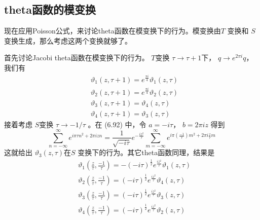 \subsection{theta函数的模变换}
现在应用Poisson公式，来讨论theta函数在模变换下的行为。模变换由$ T$ 变换和 $S $变换生成，那么考虑这两个变换就够了。

首先讨论Jacobi theta函数在模变换下的行为。 $T $变换 $\tau \rightarrow \tau+1 $下， $q \rightarrow e^{2 \pi i} q $，我们有
\begin{align} &\vartheta_{1}(z, \tau+1)=e^{\frac{\pi i}{4}} \vartheta_{1}(z, \tau)\\ &\vartheta_{2}(z, \tau+1)=e^{\frac{\pi i}{4}} \vartheta_{2}(z, \tau)\\ &\vartheta_{3}(z, \tau+1)=\vartheta_{4}(z, \tau)\\ &\vartheta_{4}(z, \tau+1)=\vartheta_{3}(z, \tau) \end{align}
接着考虑 $S $变换 $\tau\to -1/\tau$ 。在 (6.92) 中，令 $a=-i \tau $， $b=2 \pi i z$ 得到
\begin{equation}
	\sum_{n=-\infty}^{\infty} e^{i \pi \tau n^{2}+2 \pi i z n}=\frac{1}{\sqrt{-i \tau}} e^{-\frac{i z^{2}}{\tau}} \sum_{m=-\infty}^{\infty} e^{i \pi\left(\frac{-1}{\tau}\right) m^{2}+2 \pi i \frac{z}{\tau} m}
\end{equation} 
这就给出 $\vartheta_{3}(z, \tau) $在$ S$ 变换下的行为。其它theta函数同理，结果是
\begin{align} &\vartheta_{1}\left(\frac{z}{\tau}, \frac{-1}{\tau}\right)=-(-i \tau)^{\frac{1}{2}} e^{\frac{i z^{2}}{\tau}} \vartheta_{1}(z, \tau)\\ &\vartheta_{2}\left(\frac{z}{\tau}, \frac{-1}{\tau}\right)=(-i \tau)^{\frac{1}{2}} e^{\frac{i z^{2}}{\tau}} \vartheta_{4}(z, \tau)\\ &\vartheta_{3}\left(\frac{z}{\tau}, \frac{-1}{\tau}\right)=(-i \tau)^{\frac{1}{2}} e^{\frac{i z^{2}}{\tau}} \vartheta_{3}(z, \tau)\\ &\vartheta_{4}\left(\frac{z}{\tau}, \frac{-1}{\tau}\right)=(-i \tau)^{\frac{1}{2}} e^{\frac{i z^{2}}{\tau}} \vartheta_{2}(z, \tau) \end{align}

